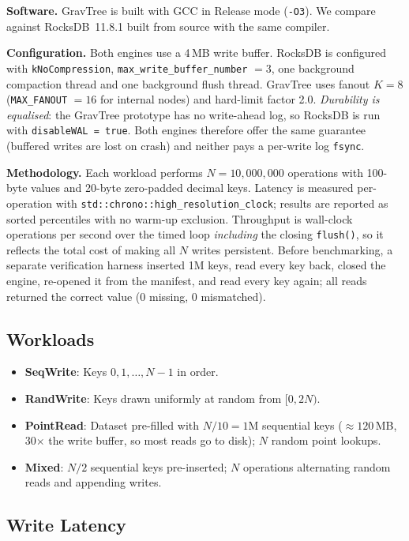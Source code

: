 \documentclass[10pt,twocolumn]{article}
\begin{document}
\textbf{Software.}  GravTree is built with GCC in Release mode
(\texttt{-O3}).  We compare against RocksDB~11.8.1 built from source with the
same compiler.

\textbf{Configuration.}  Both engines use a 4\,MB write buffer.  RocksDB is
configured with \texttt{kNoCompression}, \texttt{max\_write\_buffer\_number}
$= 3$, one background compaction thread and one background flush thread.
GravTree uses fanout $K = 8$ (\texttt{MAX\_FANOUT} $= 16$ for internal nodes)
and hard-limit factor 2.0.  \emph{Durability is equalised}: the GravTree
prototype has no write-ahead log, so RocksDB is run with
\texttt{disableWAL = true}.  Both engines therefore offer the same guarantee
(buffered writes are lost on crash) and neither pays a per-write log
\texttt{fsync}.

\textbf{Methodology.}  Each workload performs $N = 10{,}000{,}000$ operations
with 100-byte values and 20-byte zero-padded decimal keys.  Latency is
measured per-operation with \texttt{std::chrono::high\_resolution\_clock};
results are reported as sorted percentiles with no warm-up exclusion.
Throughput is wall-clock operations per second over the timed loop
\emph{including} the closing \texttt{flush()}, so it reflects the total cost
of making all $N$ writes persistent.  Before benchmarking, a separate
verification harness inserted 1M keys, read every key back, closed the
engine, re-opened it from the manifest, and read every key again; all reads
returned the correct value (0 missing, 0 mismatched).

\subsection{Workloads}

\begin{itemize}
  \item \textbf{SeqWrite}: Keys $0, 1, \ldots, N{-}1$ in order.
  \item \textbf{RandWrite}: Keys drawn uniformly at random from $[0, 2N)$.
  \item \textbf{PointRead}: Dataset pre-filled with $N/10 = 1$M sequential
        keys ($\approx 120$\,MB, 30$\times$ the write buffer, so most reads go
        to disk); $N$ random point lookups.
  \item \textbf{Mixed}: $N/2$ sequential keys pre-inserted; $N$ operations
        alternating random reads and appending writes.
\end{itemize}

\subsection{Write Latency}
\end{document}
